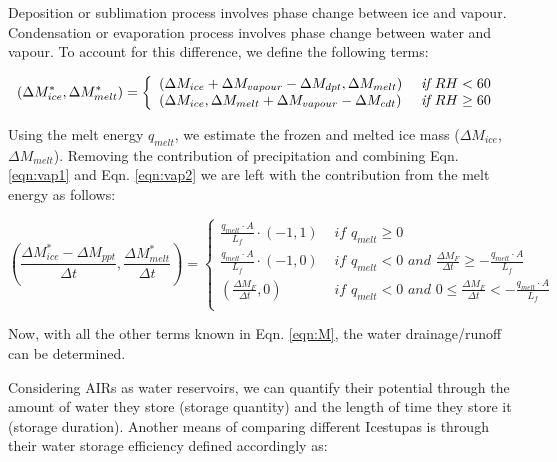 \documentclass[utf8]{frontiersSCNS} %
\begin{document}
Deposition or sublimation process involves phase change between ice and vapour.  Condensation or evaporation process
involves phase change between water and vapour. To account for this difference, we define the following terms: 

  \begin{equation}
    (\Delta M_{ice}^*, \Delta M_{melt}^*) = \left\{ \begin{array}{ll} (\Delta M_{ice} + \Delta M_{vapour} - \Delta M_{dpt}, \Delta
        M_{melt})& \textit{ if
    } RH<60 \\ (\Delta M_{ice},\Delta M_{melt} + \Delta M_{vapour} - \Delta M_{cdt})& \textit{ if } RH\geq60\\  \end{array} \right.\\  \label{eqn:vap2}
\end{equation}

Using the melt energy $q_{melt}$, we estimate the frozen and melted ice mass ($\Delta M_{ice}$, $\Delta M_{melt}$).
  Removing the contribution of precipitation and combining Eqn. \ref{eqn:vap1} and Eqn. \ref{eqn:vap2} we are left with the contribution from the
melt energy as follows:

\begin{equation} (\frac{\Delta M_{ice}^*-\Delta M_{ppt}}{\Delta
    t}, \frac{\Delta M_{melt}^*}{\Delta t})
= \left\{ \begin{array}{ll} \frac{q_{melt} \cdot A }{L_f} \cdot (-1, 1 )& \textit{ if } q_{melt} \geq 0 \\
\frac{q_{melt} \cdot A }{L_f} \cdot (-1, 0) & \textit{ if } q_{melt} < 0 \textit{ and } \frac{\Delta M_{F}}{\Delta t}
\geq -\frac{q_{melt} \cdot A }{L_f} \\
(\frac{\Delta M_{F}}{\Delta t}, 0) & \textit{ if } q_{melt} < 0 \textit{ and } 0 \leq
\frac{\Delta M_{F}}{\Delta t} < -\frac{q_{melt} \cdot A }{L_f}\\ \end{array} \right.  \end{equation}


Now, with all the other terms known in Eqn. \ref{eqn:M}, the water drainage/runoff can be determined. 

Considering AIRs as water reservoirs, we can quantify their potential through the amount of water they store (storage
quantity) and the length of time they store it (storage duration). Another means of comparing different Icestupas is
through their water storage efficiency defined accordingly as:
\end{document}
